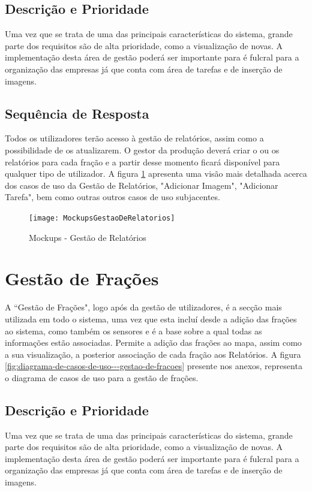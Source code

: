 \documentclass{scrreprt}
\begin{document}
	\subsection{Descrição e Prioridade}
	Uma vez que se trata de uma das principais características do sistema, grande parte dos requisitos são de alta prioridade, como a visualização de novas. A implementação desta área de gestão poderá ser importante para é fulcral para a organização das empresas já que conta com área de tarefas e de inserção de imagens.
	
	\subsection{Sequência de Resposta}
	Todos os utilizadores terão acesso à gestão de relatórios, assim como a possibilidade de os atualizarem. O gestor da produção deverá criar o ou os relatórios para cada fração e a partir desse momento ficará disponível para qualquer tipo de utilizador. A figura \ref{fig:mockupsgestaoderelatorios} apresenta uma visão mais detalhada acerca dos casos de uso da Gestão de Relatórios, "Adicionar Imagem", "Adicionar Tarefa", bem como outras outros casos de uso subjacentes.
	
	
	\begin{figure}[!h]
		\centering
		\texttt{[image: MockupsGestaoDeRelatorios]}
		\caption{Mockups - Gestão de Relatórios}
		\label{fig:mockupsgestaoderelatorios}
	\end{figure}
		
	\section{Gestão de Frações}
	A “Gestão de Frações", logo após da gestão de utilizadores, é a secção mais utilizada em todo o sistema, uma vez que esta incluí desde a adição das frações ao sistema, como também os sensores e é a base sobre a qual todas as informações estão associadas. Permite a adição  das frações ao mapa, assim como a sua visualização, a posterior associação de cada fração aos Relatórios. A figura \ref{fig:diagrama-de-casos-de-uso---gestao-de-fracoes} presente nos anexos, representa o diagrama de casos de uso para a gestão de frações.
	
	\subsection{Descrição e Prioridade}
	Uma vez que se trata de uma das principais características do sistema, grande parte dos requisitos são de alta prioridade, como a visualização de novas. A implementação desta área de gestão poderá ser importante para é fulcral para a organização das empresas já que conta com área de tarefas e de inserção de imagens.
	
\end{document}
